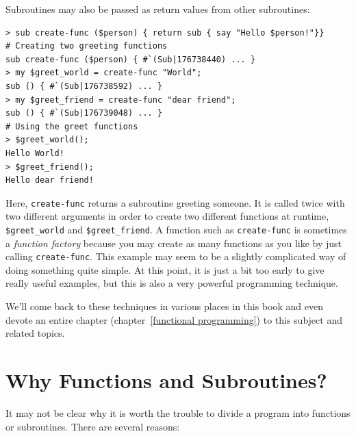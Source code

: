 Subroutines may also be passed as return values from other 
subroutines:

\begin{verbatim}
> sub create-func ($person) { return sub { say "Hello $person!"}}
# Creating two greeting functions
sub create-func ($person) { #`(Sub|176738440) ... }
> my $greet_world = create-func "World";
sub () { #`(Sub|176738592) ... }
> my $greet_friend = create-func "dear friend";
sub () { #`(Sub|176739048) ... }
# Using the greet functions
> $greet_world();
Hello World!
> $greet_friend();
Hello dear friend!
\end{verbatim} 

Here, \verb"create-func" returns a subroutine greeting someone. 
It is called twice with two different arguments in order to 
create two different functions at runtime, \verb"$greet_world" and 
\verb"$greet_friend". A function such as \verb"create-func" 
is sometimes a \emph{function factory} because you may create as many 
functions as you like by just calling \verb"create-func". This 
example may seem to be a slightly complicated way of doing 
something quite simple. At this point, it is 
just a bit too early to give really useful examples, but 
this is also a very powerful programming technique.  

We'll come back to these techniques in various places in this 
book and even devote an entire chapter (chapter~\ref{functional 
programming}) to this subject and related topics.


\section{Why Functions and Subroutines?}

It may not be clear why it is worth the trouble to divide
a program into functions or subroutines.  There are 
several reasons:


